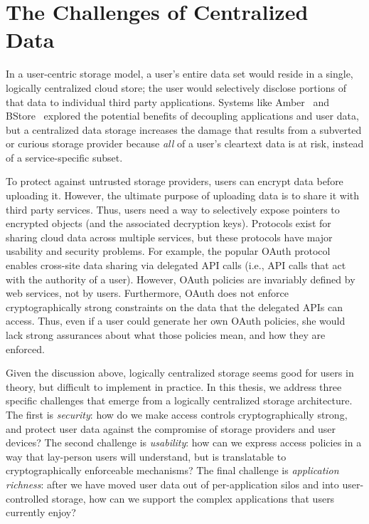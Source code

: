 \section{The Challenges of Centralized Data}

In a user-centric storage model, a user's
entire data set would reside in a single,
logically centralized cloud store; the user
would selectively disclose portions of that
data to individual third party applications.
Systems like Amber~\cite{amber} and BStore~\cite{bstore}
explored the potential benefits of 
decoupling applications and user
data, but a centralized data storage
increases the damage that results from a
subverted or curious storage provider because
\emph{all} of a user's cleartext data is at
risk, instead of a service-specific subset.

To protect against untrusted storage providers,
users can encrypt data before uploading it.
However, the ultimate purpose of uploading
data is to share it with third party services.
Thus, users need a way to selectively expose
pointers to encrypted objects (and the associated
decryption keys). Protocols exist for sharing
cloud data across multiple services, but these
protocols have major usability and security
problems. For example, the popular OAuth
protocol~\cite{oauth} enables cross-site data
sharing via delegated API calls (i.e., API
calls that act with the authority of a user).
However, OAuth policies are invariably defined
by web services, not by users. Furthermore,
OAuth does not enforce cryptographically strong
constraints on the data that the delegated
APIs can access. Thus, even if a user could
generate her own OAuth policies, she would
lack strong assurances about what those policies
mean, and how they are enforced.

Given the discussion above, logically centralized
storage seems good for users in theory, but
difficult to implement in practice. In this
thesis, we address three specific challenges
that emerge from a logically centralized storage
architecture. The first is \emph{security}: how
do we make access controls cryptographically
strong, and protect user data against the
compromise of storage providers and user devices?
The second challenge is \emph{usability}: how
can we express access policies in a way that
lay-person users will understand, but is
translatable to cryptographically enforceable
mechanisms? The final challenge is \emph{application
richness}: after we have moved user data out
of per-application silos and into user-controlled
storage, how can we support the complex 
applications that users currently enjoy?


